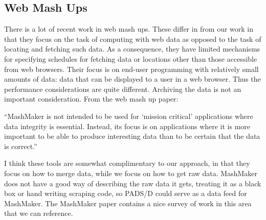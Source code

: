 
\subsection{Web Mash Ups}
There is a lot of recent work in web mash
ups\cite{ennals+:mashmaker,yahoopipes,swivel.com}.  These differ in
from our work in that they focus on the task of computing with web
data as opposed to the task of locating and fetching such data. As a
consequence, they have limited mechanisms for specifying schedules for
fetching data or locations other than those accessible from web
browsers.  Their focus is on end-user programming with relatively
small amounts of data: data that can be displayed to a user in a web
browser.  Thus the performance considerations are quite different.
Archiving the data is not an important consideration.  From the web
mash up paper:

``MashMaker is not intended to be used for `mission critical'
applications where data integrity is essential.  Instead, its focus is
on applications where it is more important to be able to produce
interesting data than to be certain that the data is correct.''

I think these tools are somewhat complimentary to our approach, in
that they focus on how to merge data, while we focus on how to get raw
data.  MashMaker does not have a good way of describing the raw data
it gets, treating it as a black box or hand writing scraping code, so
PADS/D could serve as a data feed for MashMaker.
The MashMaker paper contains a nice survey of work in this area that
we can reference.
